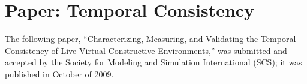 \chapter{Paper: Temporal Consistency}
\label{ch:temporal_consistency}

The following paper, ``Characterizing, Measuring, and Validating the Temporal Consistency of Live-Virtual-Constructive Environments,'' was submitted and accepted by the Society for Modeling and Simulation International (SCS); it was published in October of 2009.


